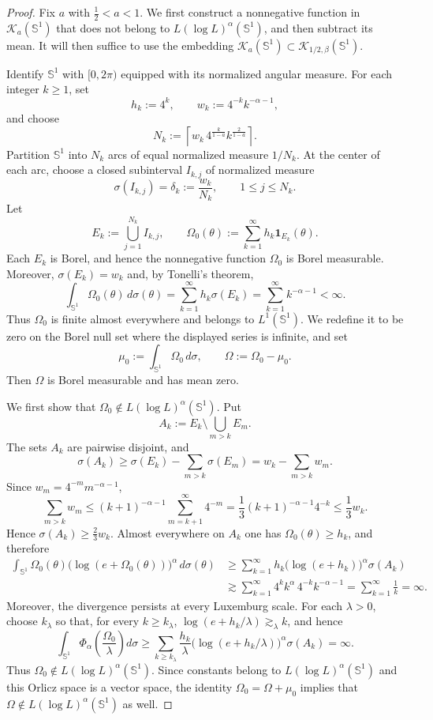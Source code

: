 \documentclass[10pt,a4paper]{amsart}
\newcommand{\Sph}{\mathbb S^1}
\newcommand{\cK}{\mathcal K}
\newcommand{\one}{\mathbf 1}
\begin{document}
	\begin{proof}
		Fix \(a\) with \(\frac12<a<1\).  We first construct a nonnegative function in
		\(\cK_a(\Sph)\) that does not belong to \(L(\log L)^\alpha(\Sph)\), and then
		subtract its mean. It will then suffice to use the embedding
		\(\cK_a(\Sph)\subset \cK_{1/2,\beta}(\Sph)\).
		
		Identify \(\Sph\) with \([0,2\pi)\) equipped with its normalized angular
		measure.  For each integer \(k\ge1\), set
		\[
		h_k:=4^k,\qquad w_k:=4^{-k}k^{-\alpha-1},
		\]
		and choose
		\[
		N_k:=\left\lceil
		w_k\,4^{\frac{k}{1-a}}k^{\frac{2}{1-a}}
		\right\rceil.
		\]
		Partition \(\Sph\) into \(N_k\) arcs of equal normalized measure \(1/N_k\). At
		the center of each arc, choose a closed subinterval \(I_{k,j}\) of normalized
		measure
		\[
		\sigma(I_{k,j})=\delta_k:=\frac{w_k}{N_k},
		\qquad 1\le j\le N_k.
		\]
		Let
		\[
		E_k:=\bigcup_{j=1}^{N_k}I_{k,j},
		\qquad
		\Omega_0(\theta):=\sum_{k=1}^\infty h_k\one_{E_k}(\theta).
		\]
		Each \(E_k\) is Borel, and hence the nonnegative function \(\Omega_0\) is
		Borel measurable. Moreover, \(\sigma(E_k)=w_k\) and, by Tonelli's theorem,
		\[
		\int_{\Sph}\Omega_0(\theta)\,d\sigma(\theta)
		=\sum_{k=1}^\infty h_k\sigma(E_k)
		=\sum_{k=1}^\infty k^{-\alpha-1}<\infty.
		\]
		Thus \(\Omega_0\) is finite almost everywhere and belongs to \(L^1(\Sph)\).
		We redefine it to be zero on the Borel null set where the displayed series
		is infinite, and set
		\[
		\mu_0:=\int_{\Sph}\Omega_0\,d\sigma,
		\qquad
		\Omega:=\Omega_0-\mu_0.
		\]
		Then \(\Omega\) is Borel measurable and has mean zero.
		
		We first show that \(\Omega_0\notin L(\log L)^\alpha(\Sph)\). Put
		\[
		A_k:=E_k\setminus\bigcup_{m>k}E_m.
		\]
		The sets \(A_k\) are pairwise disjoint, and
		\[
		\sigma(A_k)\ge \sigma(E_k)-\sum_{m>k}\sigma(E_m)
		=w_k-\sum_{m>k}w_m.
		\]
		Since \(w_m=4^{-m}m^{-\alpha-1}\),
		\[
		\sum_{m>k}w_m
		\le (k+1)^{-\alpha-1}\sum_{m=k+1}^\infty 4^{-m}
		=\frac13 (k+1)^{-\alpha-1}4^{-k}
		\le \frac13 w_k.
		\]
		Hence \(\sigma(A_k)\ge \frac23w_k\). Almost everywhere on \(A_k\) one has
		\(\Omega_0(\theta)\ge h_k\), and therefore
		\[
		\begin{aligned}
			\int_{\Sph}\Omega_0(\theta)
			\bigl(\log(e+\Omega_0(\theta))\bigr)^\alpha\,d\sigma(\theta)
			&\ge
			\sum_{k=1}^\infty h_k\bigl(\log(e+h_k)\bigr)^\alpha\sigma(A_k)\\
			&\gtrsim
			\sum_{k=1}^\infty 4^k k^\alpha\,4^{-k}k^{-\alpha-1}
			=\sum_{k=1}^\infty \frac1k
			=\infty.
		\end{aligned}
		\]
		Moreover, the divergence persists at every Luxemburg scale. For each
		\(\lambda>0\), choose \(k_\lambda\) so that, for every
		\(k\ge k_\lambda\),
		\(\log(e+h_k/\lambda)\gtrsim_\lambda k\), and hence
		\[
		\int_{\Sph}\Phi_\alpha\!\left(\frac{\Omega_0}{\lambda}\right)d\sigma
		\ge
		\sum_{k\ge k_\lambda}
		\frac{h_k}{\lambda}
		\bigl(\log(e+h_k/\lambda)\bigr)^\alpha\sigma(A_k)
		=\infty.
		\]
		Thus \(\Omega_0\notin L(\log L)^\alpha(\Sph)\). Since constants belong to
		\(L(\log L)^\alpha(\Sph)\) and this Orlicz space is a vector space, the
		identity \(\Omega_0=\Omega+\mu_0\) implies that
		\(\Omega\notin L(\log L)^\alpha(\Sph)\) as well.
		

\end{proof}
\end{document}
